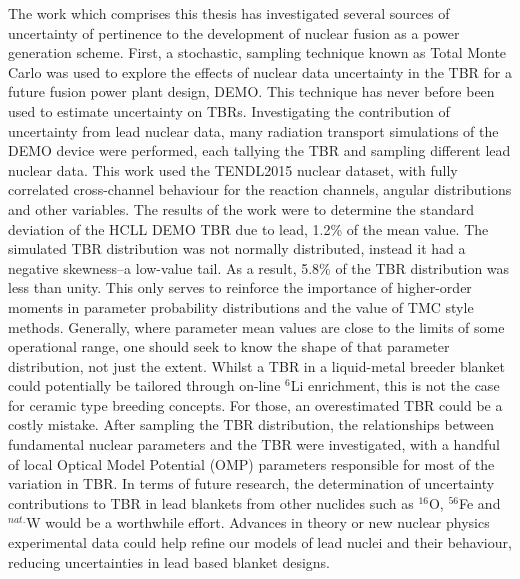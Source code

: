 The work which comprises this thesis has investigated several sources of uncertainty of pertinence to the development of nuclear fusion as a power generation scheme. First, a stochastic, sampling technique known as Total Monte Carlo was used to explore the effects of nuclear data uncertainty in the TBR for a future fusion power plant design, DEMO. This technique has never before been used to estimate uncertainty on TBRs. Investigating the contribution of uncertainty from lead nuclear data, many radiation transport simulations of the DEMO device were performed, each tallying the TBR and sampling different lead nuclear data. This work used the TENDL2015 nuclear dataset, with fully correlated cross-channel behaviour for the reaction channels, angular distributions and other variables. The results of the work were to determine the standard deviation of the HCLL DEMO TBR due to lead, 1.2\% of the mean value. The simulated TBR distribution was not normally distributed, instead it had a negative skewness--a low-value tail. As a result, 5.8\% of the TBR distribution was less than unity. This only serves to reinforce the importance of higher-order moments in parameter probability distributions and the value of TMC style methods. Generally, where parameter mean values are close to the limits of some operational range, one should seek to know the shape of that parameter distribution, not just the extent. Whilst a TBR in a liquid-metal breeder blanket could potentially be tailored through on-line $^{6}$Li enrichment, this is not the case for ceramic type breeding concepts. For those, an overestimated TBR could be a costly mistake. After sampling the TBR distribution, the relationships between fundamental nuclear parameters and the TBR were investigated, with a handful of local Optical Model Potential (OMP) parameters responsible for most of the variation in TBR. In terms of future research, the determination of uncertainty contributions to TBR in lead blankets from other nuclides such as $^{16}$O, $^{56}$Fe and $^{nat.}$W would be a worthwhile effort. Advances in theory or new nuclear physics experimental data could help refine our models of lead nuclei and their behaviour, reducing uncertainties in lead based blanket designs.


